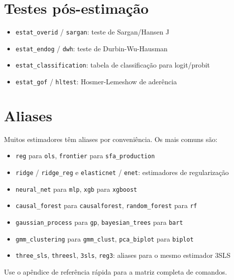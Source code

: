\section{Testes pós-estimação}

\begin{itemize}
\item \texttt{estat\_overid} / \texttt{sargan}: teste de Sargan/Hansen J
\item \texttt{estat\_endog} / \texttt{dwh}: teste de Durbin-Wu-Hausman
\item \texttt{estat\_classification}: tabela de classificação para
      logit/probit
\item \texttt{estat\_gof} / \texttt{hltest}: Hosmer-Lemeshow de aderência
\end{itemize}

\section{Aliases}

Muitos estimadores têm aliases por conveniência. Os mais comuns são:

\begin{itemize}
\item \texttt{reg} para \texttt{ols}, \texttt{frontier} para \texttt{sfa\_production}
\item \texttt{ridge} / \texttt{ridge\_reg} e \texttt{elasticnet} / \texttt{enet}: estimadores de regularização
\item \texttt{neural\_net} para \texttt{mlp}, \texttt{xgb} para \texttt{xgboost}
\item \texttt{causal\_forest} para \texttt{causalforest}, \texttt{random\_forest} para \texttt{rf}
\item \texttt{gaussian\_process} para \texttt{gp}, \texttt{bayesian\_trees} para \texttt{bart}
\item \texttt{gmm\_clustering} para \texttt{gmm\_clust}, \texttt{pca\_biplot} para \texttt{biplot}
\item \texttt{three\_sls}, \texttt{threesl}, \texttt{3sls}, \texttt{reg3}: aliases para o
      mesmo estimador 3SLS
\end{itemize}

Use o apêndice de referência rápida para a matriz completa de comandos.
